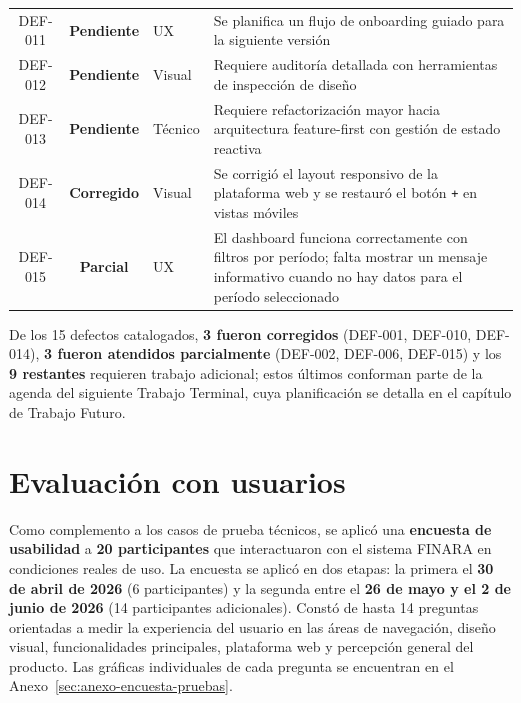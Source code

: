 \begin{table}[H]
\begin{tabular}{c c l p{7.5cm}}
    DEF-011 & \textcolor{BrickRed}{\textbf{Pendiente}}   & UX        &
      Se planifica un flujo de onboarding guiado para la siguiente versión \\[4pt]
    DEF-012 & \textcolor{BrickRed}{\textbf{Pendiente}}   & Visual    &
      Requiere auditoría detallada con herramientas de inspección de diseño \\[4pt]
    DEF-013 & \textcolor{BrickRed}{\textbf{Pendiente}}   & Técnico   &
      Requiere refactorización mayor hacia arquitectura feature-first con gestión de estado reactiva \\[4pt]
    DEF-014 & \textcolor{OliveGreen}{\textbf{Corregido}} & Visual    &
      Se corrigió el layout responsivo de la plataforma web y se restauró el botón \texttt{+} en vistas móviles \\[4pt]
    DEF-015 & \textcolor{BurntOrange}{\textbf{Parcial}}  & UX        &
      El dashboard funciona correctamente con filtros por período; falta mostrar un mensaje informativo cuando no hay datos para el período seleccionado \\
    \bottomrule
  \end{tabular}
\end{table}

De los 15 defectos catalogados, \textbf{3 fueron corregidos} (DEF-001, DEF-010, DEF-014), \textbf{3 fueron atendidos parcialmente} (DEF-002, DEF-006, DEF-015) y los \textbf{9 restantes} requieren trabajo adicional; estos últimos conforman parte de la agenda del siguiente Trabajo Terminal, cuya planificación se detalla en el capítulo de Trabajo Futuro.

\section{Evaluación con usuarios}

Como complemento a los casos de prueba técnicos, se aplicó una \textbf{encuesta de usabilidad} a \textbf{20 participantes} que interactuaron con el sistema FINARA en condiciones reales de uso. La encuesta se aplicó en dos etapas: la primera el \textbf{30 de abril de 2026} (6 participantes) y la segunda entre el \textbf{26 de mayo y el 2 de junio de 2026} (14 participantes adicionales). Constó de hasta 14 preguntas orientadas a medir la experiencia del usuario en las áreas de navegación, diseño visual, funcionalidades principales, plataforma web y percepción general del producto. Las gráficas individuales de cada pregunta se encuentran en el Anexo~\ref{sec:anexo-encuesta-pruebas}.

